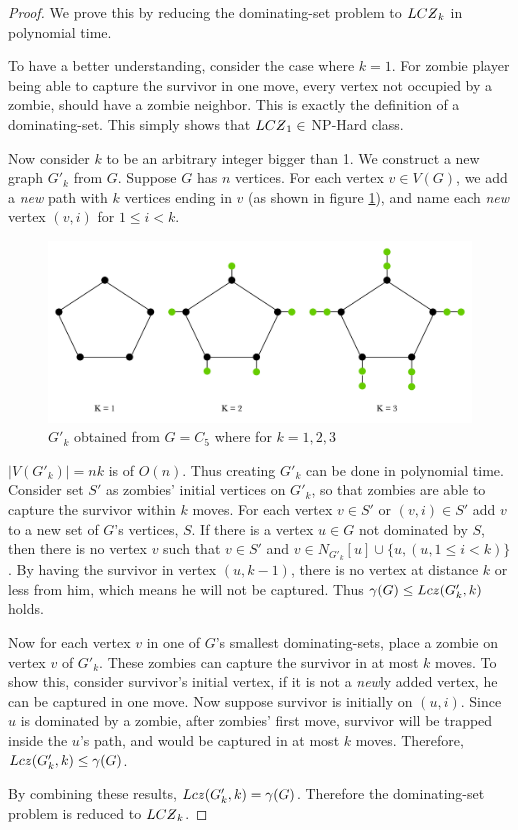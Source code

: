 \documentclass[1p]{elsarticle}
\newcommand{\NPZ}{\ooalign{$Z$\cr\hfil\rule[.8ex]{.3em}{.09ex}\hfil\cr}}
\newcommand{\zn}{\ooalign{$z$\cr\hfil\rule[.5ex]{.2em}{.08ex}\hfil\cr}}
\begin{document}
	\begin{proof}
		We prove this by reducing the dominating-set problem to $LC\NPZ_k$ in polynomial time.

		To have a better understanding, consider the case where $k=1$. For zombie player being able to capture the
		survivor in one move, every vertex not occupied by a zombie, should have a zombie neighbor. This is exactly the
		definition of a dominating-set. This simply shows that $LC\NPZ_1 \in$ NP-Hard class.

		Now consider $k$ to be an arbitrary integer bigger than 1. We construct a new graph $G'_k$ from $G$. Suppose $G$
		has $n$ vertices. For each vertex $v \in V(G)$, we add a {\it new} path with $k$ vertices ending in $v$ (as
		shown in figure \ref{fig:p7}), and name each {\it new} vertex $(v,i)$ for $1 \leq i < k$. 

		\begin{figure}[h!]
			\centering
			\includegraphics[width=0.9\linewidth]{fig/LCZ.png}
			\caption{$G'_k$ obtained from $G = C_5$ where for $k = 1,2,3$}
			\label{fig:p7}
		\end{figure}		


		$|V(G'_k)| = nk$ is of $O(n)$. Thus creating $G'_k$ can be done in polynomial time. Consider set $S'$ as zombies'
		initial vertices on $G'_k$, so that zombies are able to capture the survivor within $k$ moves. For each vertex $v \in
		S'$ or $(v,i) \in S'$ add $v$ to a new set of $G$'s vertices, $S$. If there is a vertex $u \in G$ not dominated by
		$S$, then there is no vertex $v$ such that $v \in S'$ and $v \in N_{G'_k}[u] \cup \{u, (u,1 \leq i < k)\}$. By having
		the survivor in vertex $(u, k-1)$, there is no vertex at distance $k$ or less from him, which means he will not
		be captured. Thus $\gamma(G) \leq Lc\zn(G'_k,k)$ holds.
		
		Now for each vertex $v$ in one of $G$'s smallest dominating-sets, place a zombie on vertex $v$ of $G'_k$. These
		zombies can capture the survivor in at most $k$ moves. To show this, consider survivor's initial vertex, if it
		is not a {\it new}ly added vertex, he can be captured in one move. Now suppose survivor is initially on $(u,i)$. Since
		$u$ is dominated by a zombie, after zombies' first move, survivor will be trapped inside the $u$'s path, and would
		be captured in at most $k$ moves. Therefore, $Lc\zn(G'_k,k) \leq \gamma(G)$.

		By combining these results, $Lc\zn(G'_k,k) = \gamma(G)$. Therefore the dominating-set problem is reduced to
		$LC\NPZ_k$.

	\end{proof}
\end{document}
